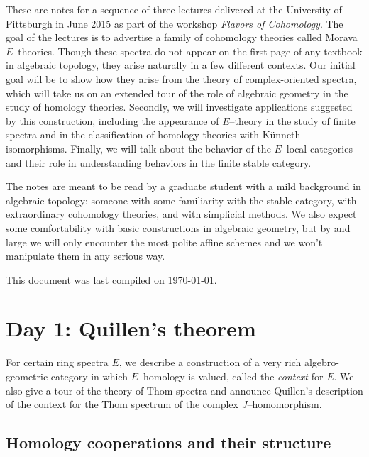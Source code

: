 
\newpage



These are notes for a sequence of three lectures delivered at the University of Pittsburgh in June 2015 as part of the workshop \textit{Flavors of Cohomology}.  The goal of the lectures is to advertise a family of cohomology theories called Morava $E$--theories.  Though these spectra do not appear on the first page of any textbook in algebraic topology, they arise naturally in a few different contexts.  Our initial goal will be to show how they arise from the theory of complex-oriented spectra, which will take us on an extended tour of the role of algebraic geometry in the study of homology theories.  Secondly, we will investigate applications suggested by this construction, including the appearance of $E$--theory in the study of finite spectra and in the classification of homology theories with K\"unneth isomorphisms.  Finally, we will talk about the behavior of the $E$--local categories and their role in understanding behaviors in the finite stable category.

The notes are meant to be read by a graduate student with a mild background in algebraic topology: someone with some familiarity with the stable category, with extraordinary cohomology theories, and with simplicial methods.  We also expect some comfortability with basic constructions in algebraic geometry, but by and large we will only encounter the most polite affine schemes and we won't manipulate them in any serious way.

This document was last compiled on \today.









\newpage
\section*{Day 1: Quillen's theorem}


For certain ring spectra $E$, we describe a construction of a very rich algebro-geometric category in which $E$--homology is valued, called the \textit{context} for $E$.  We also give a tour of the theory of Thom spectra and announce Quillen's description of the context for the Thom spectrum of the complex $J$--homomorphism.



\subsection*{Homology cooperations and their structure}

